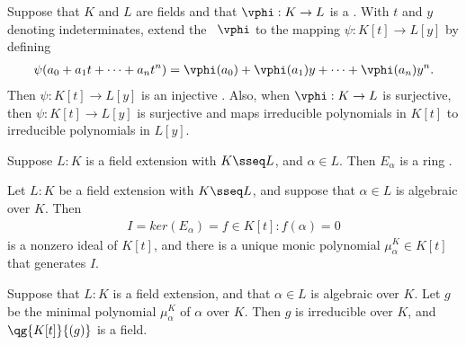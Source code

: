 \documentclass{article}
\begin{document}















\vspace{10em}

\begin{tproposition}
  Suppose that $K$ and $L$ are fields and that $\vphi : K \to L$ is a \homo. With $t$ and $y$ denoting indeterminates, extend the \homo~$ \vphi $ to the mapping $\psi: K[t] \to L[y]$ by defining \begin{align*}
    \psi(a_0 + a_1t+\cdots + a_n t^n) = \vphi(a_0) + \vphi(a_1)y+\cdots + \vphi(a_n)y^n.
  \end{align*}
  Then $ \psi:K[t]\to L[y] $ is an injective \homo.
  Also, when $ \vphi:K\to L $ is surjective, then $\psi: K[t]\to L[y]$ is surjective and maps irreducible polynomials in $K[t]$ to irreducible polynomials in $L[y]$.
\end{tproposition}

\begin{tproposition}
  Suppose $L: K$ is a field extension with $K \sseq L$, and $\alpha\in L$.  Then $E_\alpha$ is a ring \homo.
\end{tproposition}

\begin{tproposition}
  Let $L : K$ be a field extension with $K \sseq L$, and suppose that $\alpha\in L$ is algebraic over $K$.
  Then \begin{align*}
    I = ker(E_\alpha) = {f \in K[t] : f(\alpha) = 0}
  \end{align*}
  is a nonzero ideal of $K[t]$, and there is a unique monic polynomial $\mu_\alpha^K \in K[t]$ that generates $I$.
\end{tproposition}


\begin{ttheorem}
  Suppose that $L : K$ is a field extension, and that $\alpha\in L $ is algebraic over $K$.
  Let $g$ be the minimal polynomial $\mu_\alpha^K$ of $ \alpha $ over $ K $.
  Then $ g $ is irreducible over $ K $, and $\qg{K[t]}{(g)}$ is a field.
\end{ttheorem}
\end{document}
